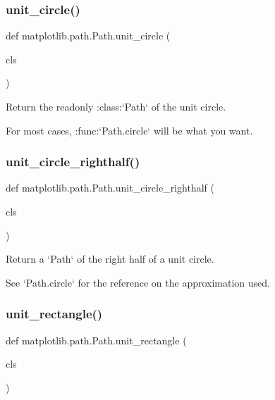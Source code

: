 \subsubsection{\texorpdfstring{unit\+\_\+circle()}{unit\_circle()}}
{\footnotesize\ttfamily def matplotlib.\+path.\+Path.\+unit\+\_\+circle (\begin{DoxyParamCaption}\item[{}]{cls }\end{DoxyParamCaption})}

\begin{DoxyVerb}Return the readonly :class:`Path` of the unit circle.

For most cases, :func:`Path.circle` will be what you want.
\end{DoxyVerb}
 \mbox{\label{classmatplotlib_1_1path_1_1Path_a54b3bec2a795959ce6ddeeb5d30a6db3}} 
\subsubsection{\texorpdfstring{unit\+\_\+circle\+\_\+righthalf()}{unit\_circle\_righthalf()}}
{\footnotesize\ttfamily def matplotlib.\+path.\+Path.\+unit\+\_\+circle\+\_\+righthalf (\begin{DoxyParamCaption}\item[{}]{cls }\end{DoxyParamCaption})}

\begin{DoxyVerb}Return a `Path` of the right half of a unit circle.

See `Path.circle` for the reference on the approximation used.
\end{DoxyVerb}
 \mbox{\label{classmatplotlib_1_1path_1_1Path_a57ee8ff0d3ce3c4fd418b88185881bcd}} 
\subsubsection{\texorpdfstring{unit\+\_\+rectangle()}{unit\_rectangle()}}
{\footnotesize\ttfamily def matplotlib.\+path.\+Path.\+unit\+\_\+rectangle (\begin{DoxyParamCaption}\item[{}]{cls }\end{DoxyParamCaption})}

